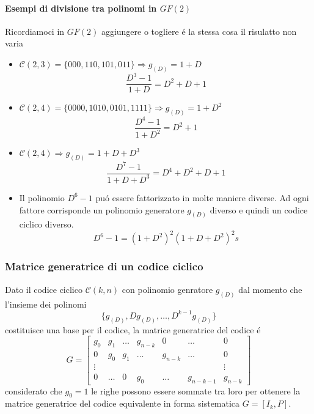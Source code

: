             \paragraph{Esempi di divisione tra polinomi in $GF(2)$}
                Ricordiamoci in $GF(2)$ aggiungere o togliere é la stessa cosa il risulatto non varia
                \begin{itemize}
                    \item {
                        $\mathcal{C}(2,3) = \{000,110,101,011\} \Rightarrow g_{(D)} = 1+D$
                        \[
                            \frac{D^3-1}{1+D} = D^2+D+1
                        \]
                    }
                    \item {
                        $\mathcal{C}(2,4) = \{0000,1010,0101,1111\} \Rightarrow g_{(D)} = 1+D^2$
                        \[
                            \frac{D^4-1}{1+D^2} = D^2+1
                        \]
                    }
                    \item {
                        $\mathcal{C}(2,4) \Rightarrow g_{(D)} = 1+D+D^3$
                        \[
                            \frac{D^7-1}{1+D+D^3} = D^4+D^2+D+1
                        \]
                    }
                    \item {
                        Il polinomio $D^6-1$ puó essere fattorizzato in molte maniere diverse. Ad ogni fattore corrisponde un polinomio
                        generatore $g_{(D)}$ diverso e quindi un codice ciclico diverso.
                        \[
                            D^6-1 = (1+D^2)^2(1+D+D^2)^2s
                        \]
                    }
                \end{itemize}
        \subsubsection{Matrice generatrice di un codice ciclico}
            Dato il codice ciclico $\mathcal{C}(k,n)$ con polinomio genratore $g_{(D)}$ dal momento che l'insieme dei polinomi
            \[
                \{g_{(D)},Dg_{(D)},\dots,D^{k-1}g_{(D)}\}  
            \]
            costituisce una base per il codice, la matrice generatrice del codice é 
            \[
                G = 
                \begin{bmatrix}
                g_0 & g_1 & \dots & g_{n-k} & 0 & \dots & 0\\ 
                0 & g_0 & g_1 & \dots & g_{n-k} & \dots & 0\\ 
                \vdots &  &  &  &  &  & \vdots\\ 
                0 & \dots & 0 & g_{0} & \dots & g_{n-k-1} & g_{n-k}
                \end{bmatrix}
            \]
            considerato che $g_0 = 1$ le righe possono essere sommate tra loro per ottenere la matrice generatrice del codice 
            equivalente in forma sistematica $G = [I_k,P]$.

